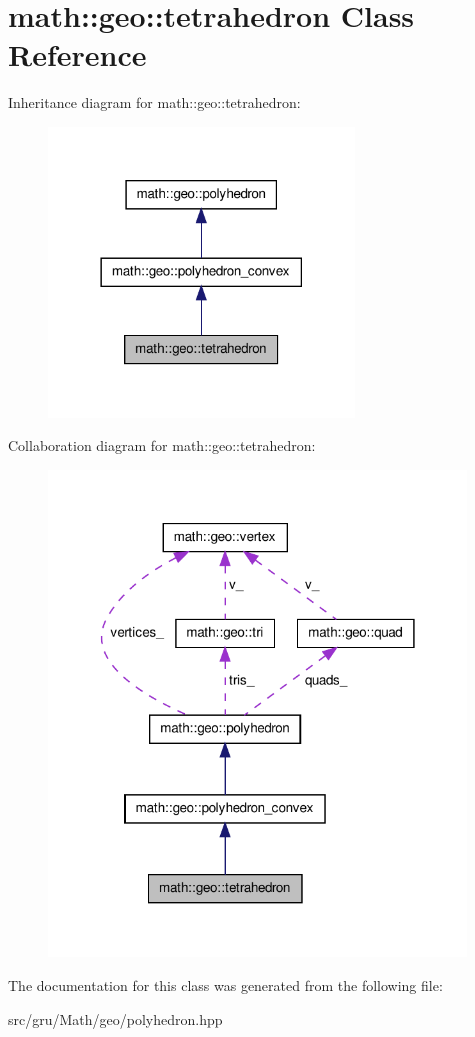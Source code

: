 \hypertarget{classmath_1_1geo_1_1tetrahedron}{\section{math\-:\-:geo\-:\-:tetrahedron \-Class \-Reference}
\label{classmath_1_1geo_1_1tetrahedron}
}


\-Inheritance diagram for math\-:\-:geo\-:\-:tetrahedron\-:
\nopagebreak
\begin{figure}[H]
\begin{center}
\leavevmode
\includegraphics[width=230pt]{classmath_1_1geo_1_1tetrahedron__inherit__graph}
\end{center}
\end{figure}


\-Collaboration diagram for math\-:\-:geo\-:\-:tetrahedron\-:
\nopagebreak
\begin{figure}[H]
\begin{center}
\leavevmode
\includegraphics[width=314pt]{classmath_1_1geo_1_1tetrahedron__coll__graph}
\end{center}
\end{figure}


\-The documentation for this class was generated from the following file\-:\begin{DoxyCompactItemize}
\item 
src/gru/\-Math/geo/polyhedron.\-hpp\end{DoxyCompactItemize}
